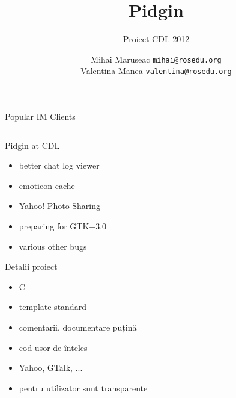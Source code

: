 \documentclass{beamer}
\title[]{Pidgin}
\subtitle{Proiect CDL 2012}
\institute[]{ROSEdu}
\author[]{
  Mihai Maruseac \texttt{mihai@rosedu.org} \\
  Valentina Manea \texttt{valentina@rosedu.org}
}
\begin{document}
\maketitle

\begin{frame}{Popular IM Clients}
  \begin{columns}[c]
    \column{1.5in}
    \column{1.5in}
  \end{columns}
\end{frame}

\begin{frame}{Pidgin at CDL}
  \begin{itemize}[<+->]
    \item better chat log viewer
    \item emoticon cache
    \item Yahoo! Photo Sharing
    \item preparing for GTK+3.0
    \item various other bugs
  \end{itemize}
\end{frame}

\begin{frame}{Detalii proiect}
  \begin{itemize}
    \item C
    \item template standard
    \item comentarii, documentare puțină
    \item cod ușor de înțeles
    \item <2-> Yahoo, GTalk, ...
    \item <2-> pentru utilizator sunt transparente
  \end{itemize}
\end{frame}
\end{document}
